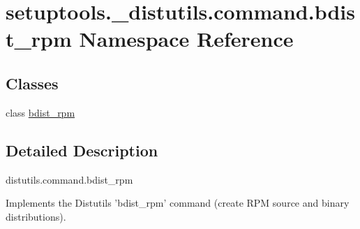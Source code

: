 \hypertarget{namespacesetuptools_1_1__distutils_1_1command_1_1bdist__rpm}{}\section{setuptools.\+\_\+distutils.\+command.\+bdist\+\_\+rpm Namespace Reference}
\label{namespacesetuptools_1_1__distutils_1_1command_1_1bdist__rpm}
\subsection*{Classes}
\begin{DoxyCompactItemize}
\item 
class \hyperlink{classsetuptools_1_1__distutils_1_1command_1_1bdist__rpm_1_1bdist__rpm}{bdist\+\_\+rpm}
\end{DoxyCompactItemize}


\subsection{Detailed Description}
\begin{DoxyVerb}distutils.command.bdist_rpm

Implements the Distutils 'bdist_rpm' command (create RPM source and binary
distributions).\end{DoxyVerb}
 
